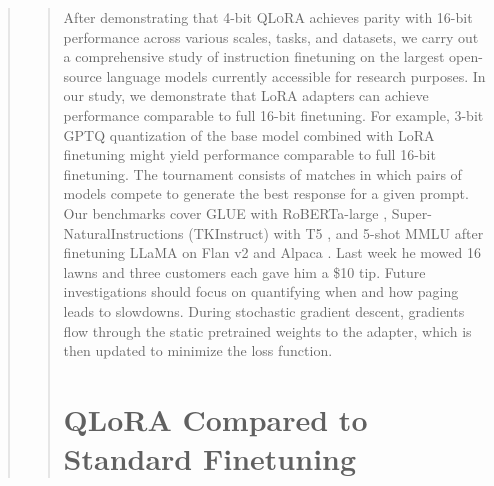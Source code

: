 \begin{quote}
{\begin{abstract}
After demonstrating that 4-bit \textsc{QLoRA} achieves parity with 16-bit performance across various scales, tasks, and datasets, we carry out a comprehensive study of instruction finetuning on the largest open-source language models currently accessible for research purposes. In our study, we demonstrate that LoRA adapters can achieve performance comparable to full 16-bit finetuning. For example, 3-bit GPTQ quantization of the base model combined with LoRA finetuning might yield performance comparable to full 16-bit finetuning. The tournament consists of matches in which pairs of models compete to generate the best response for a given prompt. Our benchmarks cover GLUE \citep{wang2018glue} with RoBERTa-large \citep{liu2019roberta}, Super-NaturalInstructions (TKInstruct) \citep{wang2022super} with T5 \citep{t5}, and 5-shot MMLU \citep{hendrycksmeasuring} after finetuning LLaMA on Flan v2 \citep{longpre2023flan} and Alpaca \citep{alpaca}. Last week he mowed 16 lawns and three customers each gave him a \$10 tip. Future investigations should focus on quantifying when and how paging leads to slowdowns. During stochastic gradient descent, gradients flow through the static pretrained weights to the adapter, which is then updated to minimize the loss function. \section{QLoRA Compared to Standard Finetuning}
\label{sec:comp_to_std}


\end{abstract}}
\end{quote}
